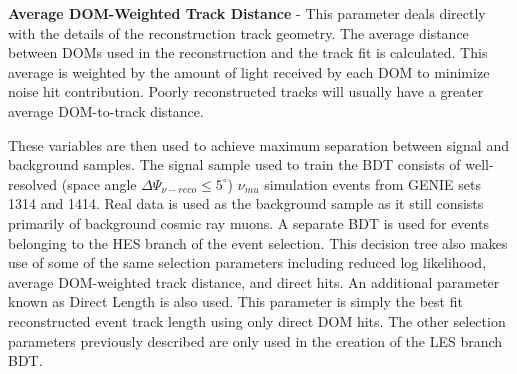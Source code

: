 \documentclass{gatech-thesis}
\begin{document}
\begin{adjustwidth}{2.5em}{2.5em}
\textbf{Average DOM-Weighted Track Distance} - This parameter deals directly with the details of the reconstruction track geometry. The average distance between DOMs used in the reconstruction and the track fit is calculated. This average is weighted by the amount of light received by each DOM to minimize noise hit contribution. Poorly reconstructed tracks will usually have a greater average DOM-to-track distance.
\end{adjustwidth}
\setlength{\parindent}{17.5pt}
These variables are then used to achieve maximum separation between signal and background samples. The signal sample used to train the BDT consists of well-resolved (space angle $\Delta \Psi_{\nu-reco} \leq 5^{\circ}$) $\nu_{mu}$ simulation events from GENIE sets 1314 and 1414. Real data is used as the background sample as it still consists primarily of background cosmic ray muons. A separate BDT is used for events belonging to the HES branch of the event selection. This decision tree also makes use of some of the same selection parameters including reduced log likelihood, average DOM-weighted track distance, and direct hits. An additional parameter known as Direct Length is also used. This parameter is simply the best fit reconstructed event track length using only direct DOM hits. The other selection parameters previously described are only used in the creation of the LES branch BDT.
\end{document}
